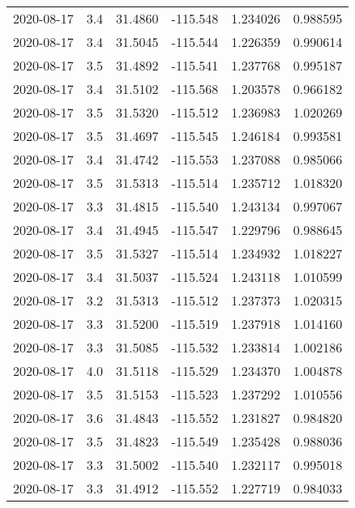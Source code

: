 \begin{tabular}{lrrrrr}
2020-08-17 &       3.4 &  31.4860 &  -115.548 &         1.234026 &         0.988595 \\
2020-08-17 &       3.4 &  31.5045 &  -115.544 &         1.226359 &         0.990614 \\
2020-08-17 &       3.5 &  31.4892 &  -115.541 &         1.237768 &         0.995187 \\
2020-08-17 &       3.4 &  31.5102 &  -115.568 &         1.203578 &         0.966182 \\
2020-08-17 &       3.5 &  31.5320 &  -115.512 &         1.236983 &         1.020269 \\
2020-08-17 &       3.5 &  31.4697 &  -115.545 &         1.246184 &         0.993581 \\
2020-08-17 &       3.4 &  31.4742 &  -115.553 &         1.237088 &         0.985066 \\
2020-08-17 &       3.5 &  31.5313 &  -115.514 &         1.235712 &         1.018320 \\
2020-08-17 &       3.3 &  31.4815 &  -115.540 &         1.243134 &         0.997067 \\
2020-08-17 &       3.4 &  31.4945 &  -115.547 &         1.229796 &         0.988645 \\
2020-08-17 &       3.5 &  31.5327 &  -115.514 &         1.234932 &         1.018227 \\
2020-08-17 &       3.4 &  31.5037 &  -115.524 &         1.243118 &         1.010599 \\
2020-08-17 &       3.2 &  31.5313 &  -115.512 &         1.237373 &         1.020315 \\
2020-08-17 &       3.3 &  31.5200 &  -115.519 &         1.237918 &         1.014160 \\
2020-08-17 &       3.3 &  31.5085 &  -115.532 &         1.233814 &         1.002186 \\
2020-08-17 &       4.0 &  31.5118 &  -115.529 &         1.234370 &         1.004878 \\
2020-08-17 &       3.5 &  31.5153 &  -115.523 &         1.237292 &         1.010556 \\
2020-08-17 &       3.6 &  31.4843 &  -115.552 &         1.231827 &         0.984820 \\
2020-08-17 &       3.5 &  31.4823 &  -115.549 &         1.235428 &         0.988036 \\
2020-08-17 &       3.3 &  31.5002 &  -115.540 &         1.232117 &         0.995018 \\
2020-08-17 &       3.3 &  31.4912 &  -115.552 &         1.227719 &         0.984033 \\

\end{tabular}
